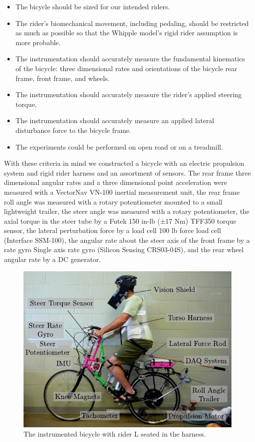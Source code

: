 \documentclass[a4paper]{article}
\begin{document}
\begin{itemize}
  \item The bicycle should be sized for our intended riders.
  \item The rider's biomechanical movement, including pedaling, should be
    restricted as much as possible so that the Whipple model's rigid rider
    assumption is more probable.
  \item The instrumentation should accurately measure the fundamental
    kinematics of the bicycle: three dimensional rates and orientations of the
    bicycle rear frame, front frame, and wheels.
  \item The instrumentation should accurately measure the rider's applied
    steering torque.
  \item The instrumentation should accurately measure an applied lateral
    disturbance force to the bicycle frame.
  \item The experiments could be performed on open road or on a treadmill.
\end{itemize}

With these criteria in mind we constructed a bicycle with an electric
propulsion system and rigid rider harness and an assortment of sensors. The
rear frame three dimensional angular rates and a three dimensional point
acceleration were measured with a VectorNav VN-100 inertial measurement unit,
the rear frame roll angle was measured with a rotary potentiometer mounted to a
small lightweight trailer, the steer angle was measured with a rotary
potentiometer, the axial torque in the steer tube by a Futek 150 in-lb (±17 Nm)
TFF350 torque sensor, the lateral perturbation force by a load cell 100 lb
force load cell (Interface SSM-100), the angular rate about the steer axis of
the front frame by a rate gyro Single axis rate gyro (Silicon Sensing
CRS03-04S), and the rear wheel angular rate by a DC generator.

\begin{figure}
  \includegraphics[width=5in]{figures/instrumented-bicycle.pdf}
  \caption{The instrumented bicycle with rider L seated in the harness.}
\end{figure}
\end{document}
